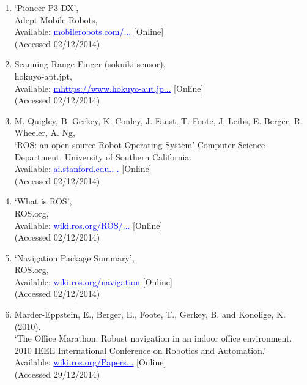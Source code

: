 \documentclass{article}
\begin{document}
\begin{multicols}{2}
\begin{enumerate}
\item ‘Pioneer P3-DX’,
\\Adept Mobile Robots,
\\Available: \href{mobilerobots.com/ResearchRobots/PioneerP3DX.aspx}{\textcolor{blue}{\uline{mobilerobots.com/...}}} [Online]
\\(Accessed 02/12/2014)

\item Scanning Range Finger (sokuiki sensor),
\\hokuyo-apt.jpt,
\\Available: \href{https://www.hokuyo-aut.jp/02sensor/07scanner/urg_04lx.html}{\textcolor{blue}{\uline{mhttps://www.hokuyo-aut.jp...}}} [Online]
\\(Accessed 02/12/2014)

\item M. Quigley, B. Gerkey, K. Conley, J. Faust, T. Foote, J. Leibs, E. Berger, R. Wheeler, A. Ng,
\\‘ROS: an open-source Robot Operating System’ Computer Science Department, University of Southern California. 
\\Available: \href{ai.stanford.edu/~ang/papers/icraoss09-ROS.pdf}{\textcolor{blue}{\uline{ai.stanford.edu.. .}}} [Online]
\\(Accessed 02/12/2014)

\item ‘What is ROS’,
\\ROS.org,
\\Available: \href{wiki.ros.org/ROS/Introduction}{\textcolor{blue}{\uline{wiki.ros.org/ROS/...}}} [Online]
\\(Accessed 02/12/2014)

\item ‘Navigation Package Summary’,
\\ROS.org,
\\Available: \href{wiki.ros.org/navigation}{\textcolor{blue}{\uline{wiki.ros.org/navigation}}} [Online]
\\(Accessed 02/12/2014)

\item Marder-Eppstein, E., Berger, E., Foote, T., Gerkey, B. and Konolige, K. (2010).
\\‘The Office Marathon: Robust navigation in an indoor office environment. 2010 IEEE International Conference on Robotics and Automation.’
\\Available: \href{wiki.ros.org/Papers/ICRA2010_Marder-Eppstein?action=AttachFile&do=view&target=icra2010_marder-eppstein.pdf}{\textcolor{blue}{\uline{wiki.ros.org/Papers...}}} [Online]
\\(Accessed 29/12/2014)


\end{enumerate}
\end{multicols}
\end{document}
